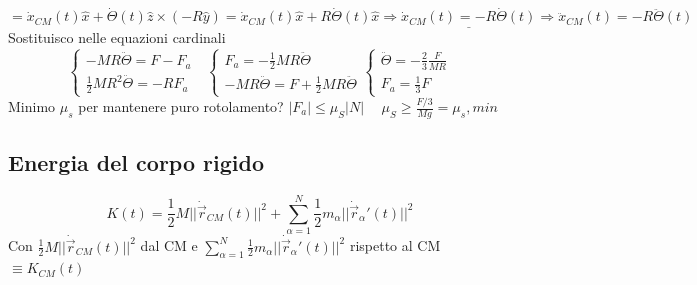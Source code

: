 $$ = \dot{x}_{CM}(t)\hat{x} + \dot{\Theta}(t)\hat{z} \times (-R\hat{y}) = \dot{x}_{CM}(t)\hat{x} + R \dot{\Theta}(t)\hat{x} \Rightarrow \underline{\dot{x}_{CM}(t) = -R\dot{\Theta}(t)} \Rightarrow \ddot{x}_{CM}(t) = -R\ddot{\Theta}(t)$$
Sostituisco nelle equazioni cardinali
$$
\begin{cases}
    -MR\ddot{\Theta} = F - F_a\\
    \frac{1}{2}MR^2 \ddot{\Theta} = -RF_a
\end{cases}
\:\:\:
\begin{cases}
    F_a = -\frac{1}{2}MR\ddot{\Theta}\\
    -MR\ddot{\Theta} = F + \frac{1}{2}MR\ddot{\Theta}
\end{cases}
\begin{cases}
    \ddot{\Theta} = -\frac{2}{3}\frac{F}{MR}\\
    F_a = \frac{1}{3}F
\end{cases}
$$
Minimo $\mu_s$ per mantenere puro rotolamento?
$|F_a| \leq \mu_S|N| \hspace{15pt} \mu_S \geq \frac{F/3}{Mg} = \mu_s,min$

\subsection{Energia del corpo rigido}
$$K(t) = \frac{1}{2}M||\dot{\vec{r}}_{CM}(t)||^2 + \sum_{\alpha=1}^{N}\frac{1}{2}m_{\alpha}||\dot{\vec{r}}_{\alpha}'(t)||^2$$
Con $\frac{1}{2}M||\dot{\vec{r}}_{CM}(t)||^2$ dal CM e $\sum_{\alpha=1}^{N}\frac{1}{2}m_{\alpha}||\dot{\vec{r}}_{\alpha}'(t)||^2$ rispetto al CM $\equiv K_{CM}(t)$